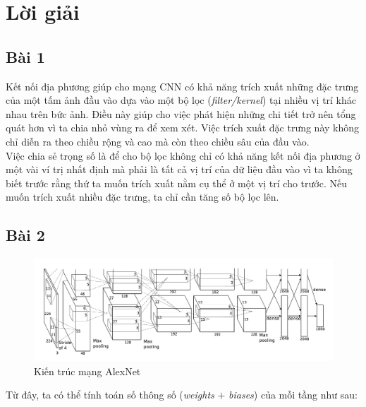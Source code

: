 \documentclass[a4paper]{article}
\begin{document}
\section{Lời giải}

\subsection{Bài 1}
Kết nối địa phương giúp cho mạng CNN có khả năng trích xuất những đặc trưng của một tấm ảnh đầu vào dựa vào một bộ lọc (\textit{filter/kernel}) tại nhiều vị trí khác nhau trên bức ảnh. Điều này giúp cho việc phát hiện những chi tiết trở nên tổng quát hơn vì ta chia nhỏ vùng ra để xem xét. Việc trích xuất đặc trưng này không chỉ diễn ra theo chiều rộng và cao mà còn theo chiều sâu của đầu vào.\\
Việc chia sẻ trọng số là để cho bộ lọc không chỉ có khả năng kết nối địa phương ở một vài ví trị nhất định mà phải là tất cả vị trí của dữ liệu đầu vào vì ta không biết trước rằng thứ ta muốn trích xuất nằm cụ thể ở một vị trí cho trước. Nếu muốn trích xuất nhiều đặc trưng, ta chỉ cần tăng số bộ lọc lên.

\subsection{Bài 2}
\begin{figure}[h!]
\centering
\includegraphics[width=17cm]{images/alexnet.png}
\caption*{Kiến trúc mạng AlexNet}
\end{figure}

\noindent
Từ đây, ta có thể tính toán số thông số (\textit{weights} $+$ \textit{biases}) của mỗi tầng như sau:
\end{document}
